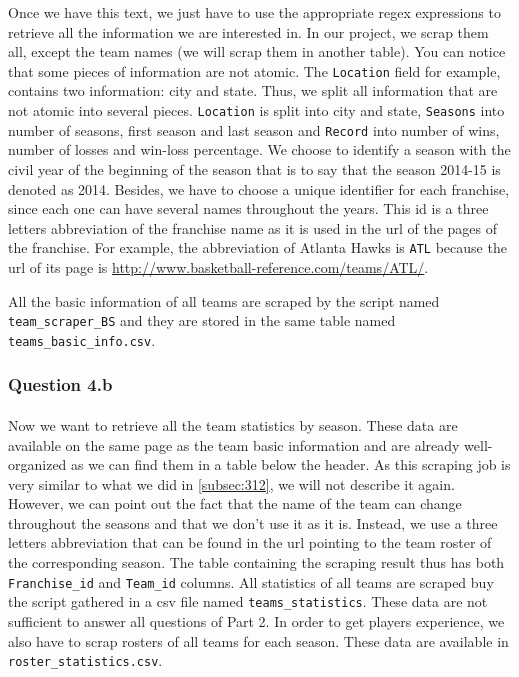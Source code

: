 	Once we have this text, we just have to use the appropriate regex expressions to retrieve all the information we are interested in. In our project, we scrap them all, except the team names (we will scrap them in another table). You can notice that some pieces of information are not atomic. The \verb|Location| field for example, contains two information: city and state. Thus, we split all information that are not atomic into several pieces. \verb|Location| is split into city and state, \verb|Seasons| into number of seasons, first season and last season and \verb|Record| into number of wins, number of losses and win-loss percentage. We choose to identify a season with the civil year of the beginning of the season that is to say that the season 2014-15 is denoted as 2014. Besides, we have to choose a unique identifier for each franchise, since each one can have several names throughout the years. This id is a three letters abbreviation of the franchise name as it is used in the url of the pages of the franchise. For example, the abbreviation of Atlanta Hawks is \verb|ATL| because the url of its page is \url{http://www.basketball-reference.com/teams/ATL/}.

	All the basic information of all teams are scraped by the script named \\ \verb|team_scraper_BS| and they are stored in the same table named \\ \verb|teams_basic_info.csv|. 

\subsubsection{Question 4.b}
\label{subsubsec:314b}

\paragraph{}Now we want to retrieve all the team statistics by season. These data are available on the same page as the team basic information and are already well-organized as we can find them in a table below the header. As this scraping job is very similar to what we did in \ref{subsec:312}, we will not describe it again. However, we can point out the fact that the name of the team can change throughout the seasons and that we don't use it as it is. Instead, we use a three letters abbreviation that can be found in the url pointing to the team roster of the corresponding season. The table containing the scraping result thus has both \verb|Franchise_id| and \verb|Team_id| columns. All statistics of all teams are scraped buy the script gathered in a csv file named \verb|teams_statistics|.
These data are not sufficient to answer all questions of Part 2. In order to get players experience, we also have to scrap rosters of all teams for each season. These data are available in  \verb|roster_statistics.csv|.
